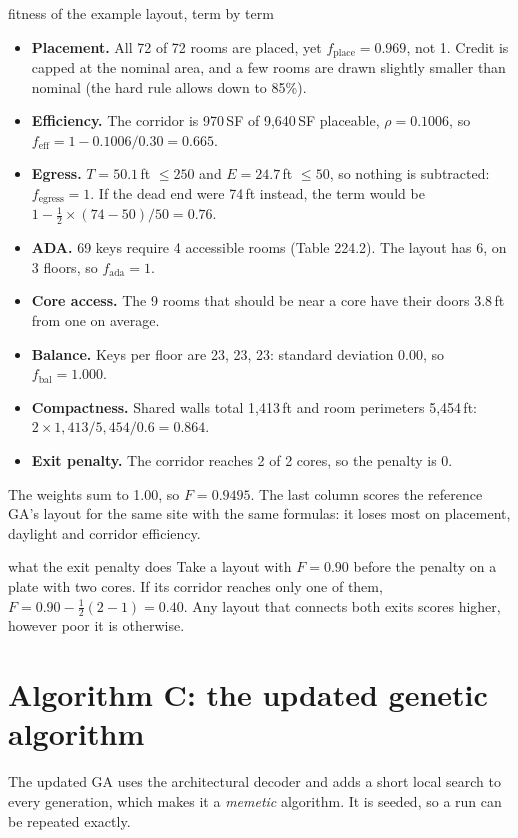 \documentclass[10pt,a4paper]{article}
\begin{document}
\begin{example}{fitness of the example layout, term by term}
\begin{itemize}
\item \textbf{Placement.} All 72 of 72 rooms are placed, yet $f_{\text{place}} = 0.969$, not 1. Credit is
capped at the nominal area, and a few rooms are drawn slightly smaller than nominal (the hard rule allows down to
85\%).
\item \textbf{Efficiency.} The corridor is 970\,SF of 9,640\,SF placeable, $\rho = 0.1006$, so
$f_{\text{eff}} = 1 - 0.1006/0.30 = 0.665$.
\item \textbf{Egress.} $T = 50.1$\,ft $\le 250$ and $E = 24.7$\,ft $\le 50$, so nothing is subtracted:
$f_{\text{egress}} = 1$. If the dead end were 74\,ft instead, the term would be
$1 - \tfrac12 \times (74 - 50)/50 = 0.76$.
\item \textbf{ADA.} 69 keys require 4 accessible rooms (Table 224.2). The layout has 6,
on 3 floors, so $f_{\text{ada}} = 1$.
\item \textbf{Core access.} The 9 rooms that should be near a core have their doors 3.8\,ft from one
on average.
\item \textbf{Balance.} Keys per floor are 23, 23, 23: standard deviation 0.00, so $f_{\text{bal}} = 1.000$.
\item \textbf{Compactness.} Shared walls total 1,413\,ft and room perimeters 5,454\,ft:
$2 \times 1,413 / 5,454 / 0.6 = 0.864$.
\item \textbf{Exit penalty.} The corridor reaches 2 of 2 cores, so the penalty is 0.
\end{itemize}
The weights sum to 1.00, so $F = 0.9495$. The last column scores the reference GA's layout for the same site with
the same formulas: it loses most on placement, daylight and corridor efficiency.
\end{example}

\begin{example}{what the exit penalty does}
Take a layout with $F = 0.90$ before the penalty on a plate with two cores. If its corridor reaches only one of them,
$F = 0.90 - \tfrac12 (2 - 1) = 0.40$. Any layout that connects both exits scores higher, however poor it is otherwise.
\end{example}


\section{Algorithm C: the updated genetic algorithm}\label{sec:ga}
The updated GA uses the architectural decoder and adds a short local search to every generation, which makes it a
\emph{memetic} algorithm. It is seeded, so a run can be repeated exactly.
\end{document}
